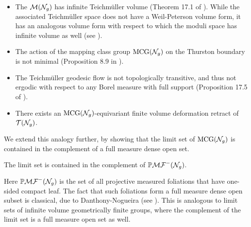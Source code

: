 \documentclass[12pt, reqno]{amsart}
\begin{document}
\begin{itemize}
\item The $\mathcal{M}(\mathcal{N}_g)$ has infinite Teichm\"uller volume (Theorem 17.1 of \cite{gendulphe_whats_2017}).
  While the associated Teichm\"uller space does not have a Weil-Peterson volume form, it has an analogous volume form with respect to which the moduli space has infinite volume as well (see \cite{norbury2008lengths}).
\item The action of the mapping class group $\mathrm{MCG}(\mathcal{N}_g)$ on the Thurston boundary is not minimal (Proposition 8.9 in \cite{gendulphe_whats_2017}).
\item The Teichm\"uller geodesic flow is not topologically transitive, and thus not ergodic with respect to any Borel measure with full support (Proposition 17.5 of \cite{gendulphe_whats_2017}).
\item There exists an $\mathrm{MCG}(\mathcal{N}_g)$-equivariant finite volume deformation retract of $\mathcal{T}(\mathcal{N}_g)$.
\end{itemize}

We extend this analogy further, by showing that the limit set of $\mathrm{MCG}(\mathcal{N}_g)$ is contained in the complement of a full measure dense open set.
\begingroup
\def\thetheorem{\ref{cor:geolimset}}
\begin{theorem}
  The limit set is contained in the complement of $\mathbb{P}\mathcal{MF}^-(\mathcal{N}_g)$.
\end{theorem}
\addtocounter{theorem}{-1}
\endgroup
Here $\mathbb{P}\mathcal{MF}^-(\mathcal{N}_g)$ is the set of all projective measured foliations that have one-sided compact leaf.
The fact that such foliations form a full measure dense open subset is classical, due to Danthony-Nogueira (see \cite{ASENS_1990_4_23_3_469_0}).
This is analogous to limit sets of infinite volume geometrically finite groups, where the complement of the limit set is a full measure open set as well.
\end{document}
